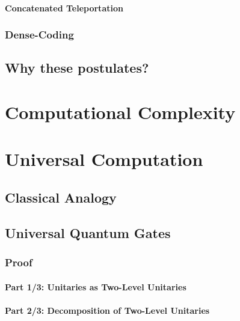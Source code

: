 			\subsubsection{Concatenated Teleportation} %

		\subsection{Dense-Coding} %

	\section{Why these postulates?} %

\chapter{Computational Complexity} %

\chapter{Universal Computation} %

	\section{Classical Analogy} %

	\section{Universal Quantum Gates} %

		\subsection{Proof} %

			\subsubsection{Part 1/3: Unitaries as Two-Level Unitaries} %

			\subsubsection{Part 2/3: Decomposition of Two-Level Unitaries} %


